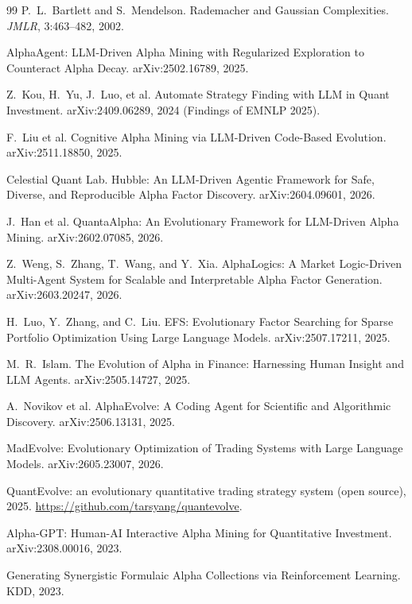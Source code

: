 \documentclass[11pt]{article}
\begin{document}
\begin{thebibliography}{99}
 P.~L.~Bartlett and S.~Mendelson.
\newblock Rademacher and Gaussian Complexities. \emph{JMLR}, 3:463--482, 2002.

 AlphaAgent: LLM-Driven Alpha Mining with Regularized Exploration to Counteract
Alpha Decay.
\newblock arXiv:2502.16789, 2025.

 Z.~Kou, H.~Yu, J.~Luo, et al.
\newblock Automate Strategy Finding with LLM in Quant Investment.
\newblock arXiv:2409.06289, 2024 (Findings of EMNLP 2025).

 F.~Liu et al.
\newblock Cognitive Alpha Mining via LLM-Driven Code-Based Evolution.
\newblock arXiv:2511.18850, 2025.

 Celestial Quant Lab.
\newblock Hubble: An LLM-Driven Agentic Framework for Safe, Diverse, and Reproducible Alpha Factor
Discovery.
\newblock arXiv:2604.09601, 2026.

 J.~Han et al.
\newblock QuantaAlpha: An Evolutionary Framework for LLM-Driven Alpha Mining.
\newblock arXiv:2602.07085, 2026.

 Z.~Weng, S.~Zhang, T.~Wang, and Y.~Xia.
\newblock AlphaLogics: A Market Logic-Driven Multi-Agent System for Scalable and Interpretable Alpha
Factor Generation.
\newblock arXiv:2603.20247, 2026.

 H.~Luo, Y.~Zhang, and C.~Liu.
\newblock EFS: Evolutionary Factor Searching for Sparse Portfolio Optimization Using Large Language
Models.
\newblock arXiv:2507.17211, 2025.

 M.~R.~Islam.
\newblock The Evolution of Alpha in Finance: Harnessing Human Insight and LLM Agents.
\newblock arXiv:2505.14727, 2025.

 A.~Novikov et al.
\newblock AlphaEvolve: A Coding Agent for Scientific and Algorithmic Discovery.
\newblock arXiv:2506.13131, 2025.

 MadEvolve: Evolutionary Optimization of Trading Systems with Large Language Models.
\newblock arXiv:2605.23007, 2026.

 QuantEvolve: an evolutionary quantitative trading strategy system (open source),
2025.
\newblock \url{https://github.com/tarsyang/quantevolve}.

 Alpha-GPT: Human-AI Interactive Alpha Mining for Quantitative Investment.
\newblock arXiv:2308.00016, 2023.

 Generating Synergistic Formulaic Alpha Collections via Reinforcement Learning.
\newblock KDD, 2023.


\end{thebibliography}
\end{document}
